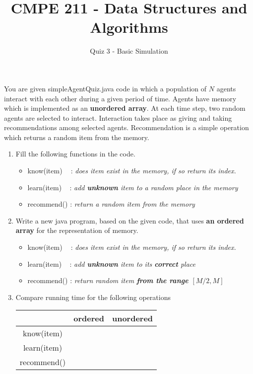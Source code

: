 \documentclass{article}
\begin{document}
\author{Quiz 3 - Basic Simulation}
\title{CMPE 211 - Data Structures and Algorithms}




\date{}
\maketitle
\setcounter{secnumdepth}{0}
You are given simpleAgentQuiz.java code in which a population of $N$ agents
interact with each other during a given period of time. 
Agents have memory which is implemented as an \textbf{unordered array}.
At each time step, two random agents are selected to interact. 
Interaction takes place as giving and taking recommendations among selected agents.
Recommendation is a simple operation which returns a random item from the memory.


\begin{enumerate}
\item Fill the following functions in the code.
\begin{itemize}
\item know(item)  $\;\;$ : \emph{does item exist in the memory, if so return its index.}
\item learn(item) $\;\;\;$: \emph{add \textbf{unknown} item to a random place in the memory}
\item recommend() : \emph{return a random item from the memory}
\end{itemize}

\item Write a new java program, based on the given code, that uses \textbf{an ordered array} for the representation of memory.
\begin{itemize}
\item know(item)  $\;\;$ : \emph{does item exist in the memory, if so return its index.}
\item learn(item) $\;\;\;$: \emph{add \textbf{unknown} item to its \textbf{correct} place}
\item recommend() : \emph{return random item \textbf{from the range $[M/2,M]$}}
\end{itemize}

\item Compare running time for the following operations
\begin{table}[htp]
\begin{center}
\begin{tabular}{c|c|c}
 & ordered & unordered\\
 \hline
\hline
know(item) & &\\
\hline
learn(item) & &\\
\hline
recommend() & &\\
\end{tabular}
\end{center}
\end{table}%


\end{enumerate}
\end{document}
